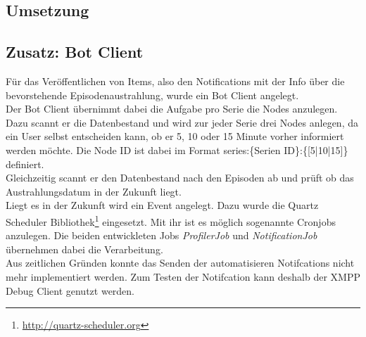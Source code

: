 \newpage
\subsection{Umsetzung}


\newpage

\subsection{Zusatz: Bot Client}

Für das Veröffentlichen von Items, also den Notifications mit der Info über die bevorstehende Episodenaustrahlung, wurde ein Bot Client angelegt.\\
Der Bot Client übernimmt dabei die Aufgabe pro Serie die Nodes anzulegen. Dazu scannt er die Datenbestand und wird zur jeder Serie drei Nodes anlegen, da ein User selbst entscheiden kann, ob er 5, 10 oder 15 Minute vorher informiert werden möchte. Die Node ID ist dabei im Format \textsf{series:\{Serien ID\}:\{[5|10|15]\}} definiert.\\
Gleichzeitig scannt er den Datenbestand nach den Episoden ab und prüft ob das Austrahlungsdatum in der Zukunft liegt.\\
Liegt es in der Zukunft wird ein Event angelegt. Dazu wurde die Quartz Scheduler Bibliothek\footnote{\url{http://quartz-scheduler.org}} eingesetzt. Mit ihr ist es möglich sogenannte Cronjobs anzulegen. Die beiden entwickleten Jobs \textit{ProfilerJob} und \textit{NotificationJob} übernehmen dabei die Verarbeitung.\\

Aus zeitlichen Gründen konnte  das Senden der automatisieren Notifcations nicht mehr implementiert werden. Zum Testen der Notifcation kann deshalb der XMPP Debug Client genutzt werden.
